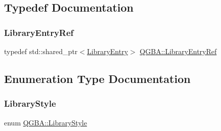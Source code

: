 \subsection{Typedef Documentation}
\mbox{\label{namespace_q_g_b_a_a201fa9f2cb8f778666a134ba81909358}} 
\subsubsection{\texorpdfstring{Library\+Entry\+Ref}{LibraryEntryRef}}
{\footnotesize\ttfamily typedef std\+::shared\+\_\+ptr$<$\mbox{\hyperlink{class_q_g_b_a_1_1_library_entry}{Library\+Entry}}$>$ \mbox{\hyperlink{namespace_q_g_b_a_a201fa9f2cb8f778666a134ba81909358}{Q\+G\+B\+A\+::\+Library\+Entry\+Ref}}}



\subsection{Enumeration Type Documentation}
\mbox{\label{namespace_q_g_b_a_a4804d48d02699a2c1d2436e9269a8bb8}} 
\subsubsection{\texorpdfstring{Library\+Style}{LibraryStyle}}
{\footnotesize\ttfamily enum \mbox{\hyperlink{namespace_q_g_b_a_a4804d48d02699a2c1d2436e9269a8bb8}{Q\+G\+B\+A\+::\+Library\+Style}}\hspace{0.3cm}{\ttfamily [strong]}}

